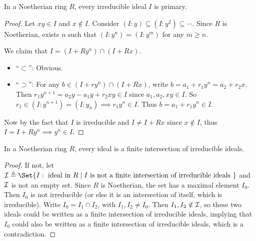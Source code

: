 \begin{theorem} \label{thm:noeth-irr-ideal-is-primary}
  In a Noetherian ring $R$, every irreducible ideal $I$ is primary.

  \begin{proof}
    Let $xy \in I$ and $x \notin I$. Consider $(I : y) \subseteq (I: y^2) \subseteq \dotsm$.
    Since $R$ is Noetherian, exists $n$ such that $(I: y^n) = (I: y^m)$ for any $m \geq n$.

    We claim that $I = (I + Ry^n) \cap (I + Rx)$.
    \begin{itemize}
      \item ``$\subset$'': Obvious.
      \item ``$\supset$'': For any $b \in (I + ry^n) \cap (I + Rx)$,
        write $b = a_1 + r_1 y^{n} = a_2 + r_2 x$. Then
        $r_1 y^{n+1} = a_2 y - a_1 y + r_2 x y \in I$ since $a_1, a_2, xy \in I$.
        So $r_1 \in (I: y^{n+1}) = (I: y_n) \implies r_1 y^n \in I$.
        Thus $b = a_1 + r_1 y^n \in I$.
    \end{itemize}

    Now by the fact that $I$ is irreducible and $I \neq I + Rx$ since $x \notin I$,
    thus $I = I + Ry^n \implies y^n \in I$.
  \end{proof}
\end{theorem}

\begin{theorem} \label{thm:noeth-ideal-is-finite-intersection}
  In a Noetherian ring $R$, every ideal is a finite intersection of irreducible ideals.

  \begin{proof}
    If not, let $\Ic \triangleq \Set{I: \text{ ideal in } R \mid I \text{ is not a finite intersection
        of irreducible ideals }}$ and $\mathcal{I}$ is not an empty set.
    Since $R$ is Noetherian, the set has a maximal element $I_0$. Then $I_0$ is not
    irreducible (or else it is an intersection of itself, which is irreducible).
    Write $I_0 = I_1 \cap I_2$, with $I_1, I_2 \neq I_0$. Then $I_1, I_2 \notin \mathcal{I}$,
    so these two ideals could be written as a finite intersection of irreducible ideals,
    implying that $I_0$ could also be written as a finite intersection of irreducible ideals,
    which is a contradiction.
  \end{proof}
\end{theorem}

